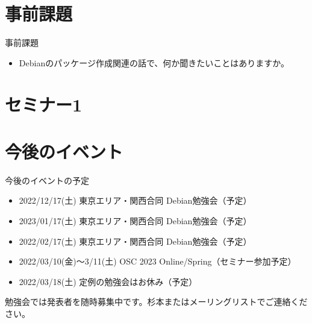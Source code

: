 \section{事前課題}


\begin{frame}{事前課題}
  \begin{itemize}
  \item Debianのパッケージ作成関連の話で、何か聞きたいことはありますか。
  \end{itemize}
\end{frame}

{\footnotesize
 
}

%

\section{セミナー1}





\section{今後のイベント}

\begin{frame}{今後のイベントの予定}
  \begin{itemize}
  \item 2022/12/17(土) 東京エリア・関西合同 Debian勉強会（予定）
  \item 2023/01/17(土) 東京エリア・関西合同 Debian勉強会（予定）
  \item 2022/02/17(土) 東京エリア・関西合同 Debian勉強会（予定）
  \item 2022/03/10(金)～3/11(土) OSC 2023 Online/Spring（セミナー参加予定）
  \item 2022/03/18(土) 定例の勉強会はお休み（予定） 
  \end{itemize}
  
勉強会では発表者を随時募集中です。杉本またはメーリングリストでご連絡ください。
\end{frame}




